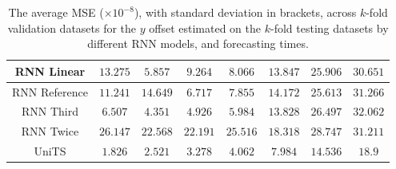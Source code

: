 \begin{table}[!ht]
{\begin{tabular}{|c|c|c|c|c|c|c|c|}
			RNN Linear & $13.275$ & $5.857$ & $9.264$ & $8.066$ & $13.847$ & $25.906$ & $30.651$ \\ \hline
			RNN Reference & $11.241$ & $14.649$ & $6.717$ & $7.855$ & $14.172$ & $25.613$ & $31.266$ \\ \hline
			RNN Third & $6.507$ & $4.351$ & $4.926$ & $5.984$ & $13.828$ & $26.497$ & $32.062$ \\ \hline
			RNN Twice & $26.147$ & $22.568$ & $22.191$ & $25.516$ & $18.318$ & $28.747$ & $31.211$ \\ \hline
			UniTS & $1.826$ & $2.521$ & $3.278$ & $4.062$ & $\mathbf{7.984}$ & $\mathbf{14.536}$ & $\mathbf{18.9}$ \\ \hline
		\end{tabular}
	}
	\caption{The average MSE ($\times 10^{-8}$), with standard deviation in brackets, across $k$-fold validation datasets for the $y$ offset estimated on the $k$-fold testing datasets by different RNN models, and forecasting times.}
	\label{tab:all_latitude_no_abs_MSE}
\end{table}

